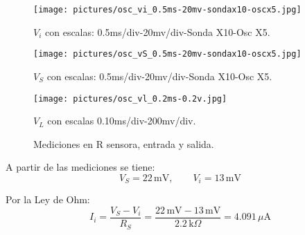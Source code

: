     \begin{figure}[!htbp]
      \centering
      \begin{minipage}[t]{0.32\textwidth}
        \centering
        \texttt{[image: pictures/osc\_vi\_0.5ms-20mv-sondax10-oscx5.jpg]}
        \caption*{\small $V_i$ con escalas: 0.5ms/div-20mv/div-Sonda X10-Osc X5.}
      \end{minipage}\hfill
      \begin{minipage}[t]{0.32\textwidth}
        \centering
        \texttt{[image: pictures/osc\_vS\_0.5ms-20mv-sondax10-oscx5.jpg]}
        \caption*{\small $V_S$ con escalas: 0.5ms/div-20mv/div-Sonda X10-Osc X5.}
      \end{minipage}\hfill
      \begin{minipage}[t]{0.32\textwidth}
        \centering
        \texttt{[image: pictures/osc\_vl\_0.2ms-0.2v.jpg]}
        \caption*{\small $V_L$ con escalas 0.10ms/div-200mv/div.}
      \end{minipage}
      \caption{Mediciones en R sensora, entrada y salida.}
    \end{figure}
    

    \vspace{0.5cm}
    A partir de las mediciones se tiene:
    \[
    V_S = 22\,\text{mV}, \qquad V_i = 13\,\text{mV}
    \]

    Por la Ley de Ohm:
    \[
    I_i = \frac{V_S - V_i}{R_S}
         = \frac{22\,\text{mV} - 13\,\text{mV}}{2.2\,\text{k}\Omega}
         = 4.091\,\mu\text{A}
    \]

